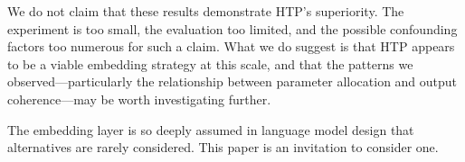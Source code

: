 \documentclass[10pt,twocolumn,a4paper]{article}
\newcommand{\htpname}{HTP}
\begin{document}
We do not claim that these results demonstrate \htpname{}'s superiority. The experiment is too small, the evaluation too limited, and the possible confounding factors too numerous for such a claim. What we do suggest is that \htpname{} appears to be a viable embedding strategy at this scale, and that the patterns we observed---particularly the relationship between parameter allocation and output coherence---may be worth investigating further.

The embedding layer is so deeply assumed in language model design that alternatives are rarely considered. This paper is an invitation to consider one.




\balance
\end{document}
